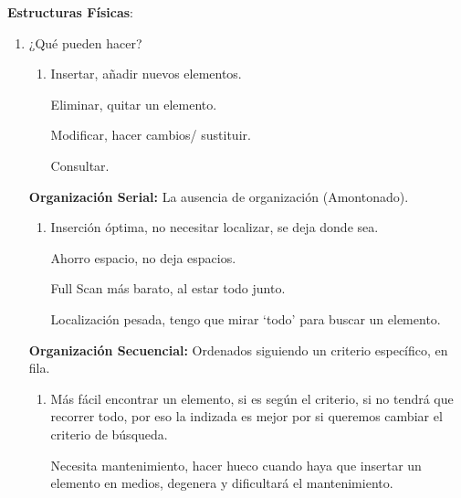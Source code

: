 \documentclass[12pt, twoside, openright]{report} %
\begin{document}
  \textbf{Estructuras Físicas}:

  \begin{enumerate}
  \item ¿Qué pueden hacer?
    

    \begin{enumerate}
    \item Insertar, añadir nuevos elementos.
      

      
      Eliminar, quitar un elemento.
      

      
      Modificar, hacer cambios/ sustituir.
      

      
      Consultar.
      
    \end{enumerate}

    
    \textbf{Organización Serial:} La ausencia de organización
    (Amontonado).
    

    \begin{enumerate}
    \item Inserción óptima, no necesitar localizar, se deja donde sea.
      

      
      Ahorro espacio, no deja espacios.
      

      
      Full Scan más barato, al estar todo junto.
      

      
      Localización pesada, tengo que mirar `todo' para buscar un
      elemento.
      
    \end{enumerate}
\pagebreak
    
    \textbf{Organización Secuencial:} Ordenados siguiendo un criterio
    específico, en fila.
    

    \begin{enumerate}
    \item Más fácil encontrar un elemento, si es según el criterio, si no
      tendrá que recorrer todo, por eso la indizada es mejor por si
      queremos cambiar el criterio de búsqueda.
      

      
      Necesita mantenimiento, hacer hueco cuando haya que insertar un
      elemento en medios, degenera y dificultará el mantenimiento.
      
    \end{enumerate}


\end{enumerate}
\end{document}
